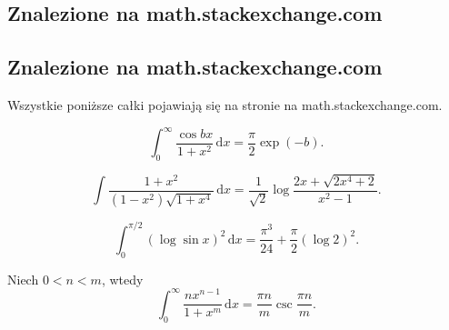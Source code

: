 %

\subsection{Znalezione na math.stackexchange.com}
\subsection{Znalezione na math.stackexchange.com}
Wszystkie poniższe całki pojawiają się na stronie na math.stackexchange.com.


\begin{problem}[pytanie 9402]
    \label{stack_9402}%
    \begin{equation}
        \int_0^\infty \frac {\cos b x}{1+x^2} \,\mathrm{d}x = \frac{\pi} 2 \exp(-b).
    \end{equation}
\end{problem}


\begin{problem}[pytanie 15719]
    \label{stack_15719}%
    \begin{equation}
        \int \frac{1 + x^2}{(1 - x^2) \sqrt{1 + x^4}} \,\mathrm{d}x = \frac{1}{\sqrt 2} \log \frac{2x + \sqrt{2x^4 + 2}}{x^2 - 1}.
    \end{equation}
\end{problem}


\begin{problem}[pytanie 58654]
    \label{stack_58654}%
    \begin{equation}
        \int_0^{\pi/2} (\log \sin x)^2 \,\mathrm{d} x = \frac{\pi^3}{24} + \frac{\pi}{2} (\log 2)^2.
    \end{equation}
\end{problem}


\begin{problem_with_solution}[pytanie 110457]
    \label{stack_110457}%
    Niech $0 < n < m$, wtedy
    \begin{equation}
        \int_0^\infty \frac{n x^{n-1}}{1 + x^m} \,\mathrm{d} x = \frac {\pi n} m \operatorname{csc} \frac {\pi n}{m}.
    \end{equation}
\end{problem_with_solution}

